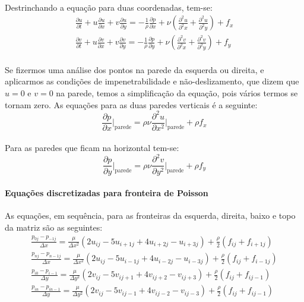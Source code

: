 \documentclass[poisson.tex]{subfiles}
\begin{document}
\paragraph{} Destrinchando a equação para duas coordenadas, tem-se:
\begin{eqnarray}
\frac{\partial u}{\partial t}+u\frac{\partial u}{\partial x}+v\frac{\partial
u}{\partial y}=-\frac{1}{\rho}\frac{\partial p}{\partial
x}+\nu\left(\frac{\partial^2 u}{\partial^2 x}+\frac{\partial^2 u}{\partial^2
y}\right)+f_x\\
\frac{\partial v}{\partial t}+u\frac{\partial v}{\partial x}+v\frac{\partial
v}{\partial y}=-\frac{1}{\rho}\frac{\partial p}{\partial
y}+\nu\left(\frac{\partial^2 v}{\partial^2 x}+\frac{\partial^2 v}{\partial^2
y}\right)+f_y
\end{eqnarray}
\paragraph{} Se fizermos uma análise dos pontos na parede da esquerda ou
direita, e aplicarmos as condições de impenetrabilidade e não-deslizamento, que
dizem que $u=0$ e $v=0$ na parede, temos a simplificação da equação, pois vários
termos se tornam zero. As equações para as duas paredes verticais é a seguinte:
\begin{equation}
\frac{\partial p}{\partial x}\Bigg|_{\textrm{parede}}=\rho\nu\frac{\partial^2
u}{\partial x^2}\Bigg|_{\textrm{parede}}+\rho f_x
\end{equation}
\paragraph{} Para as paredes que ficam na horizontal tem-se:
\begin{equation}
\frac{\partial p}{\partial y}\Bigg|_{\textrm{parede}}=\rho\nu\frac{\partial^2
v}{\partial y^2}\Bigg|_{\textrm{parede}}+\rho f_y
\end{equation}
\paragraph{Equações discretizadas para fronteira de Poisson} As equações, em
sequência, para as fronteiras da esquerda, direita, baixo e topo da matriz são
as seguintes:
\begin{eqnarray}
\frac{p_{0j}-p_{-1j}}{\Delta x}=\frac{\mu}{\Delta x^2}(2u_{ij}-5u_{i+1j}+4u_{i+2j}-u_{i+3j})+\frac{\rho}{2}(f_{ij}+f_{i+1j}) \label{pressure_01}\\
\frac{p_{nj}-p_{n-1j}}{\Delta x}=\frac{\mu}{\Delta x^2}(2u_{ij}-5u_{i-1j}+4u_{i-2j}-u_{i-3j})+\frac{\rho}{2}(f_{ij}+f_{i-1j})\label{pressure_02}\\
\frac{p_{i0}-p_{i-1}}{\Delta y}=\frac{\mu}{\Delta y^2}(2v_{ij}-5v_{ij+1}+4v_{ij+2}-v_{ij+3})+\frac{\rho}{2}(f_{ij}+f_{ij-1}) \label{pressure_03}\\
\frac{p_{in}-p_{in-1}}{\Delta y}=\frac{\mu}{\Delta y^2}(2v_{ij}-5v_{ij-1}+4v_{ij-2}-v_{ij-3})+\frac{\rho}{2}(f_{ij}+f_{ij-1}) \label{pressure_04}
\end{eqnarray}
\end{document}

